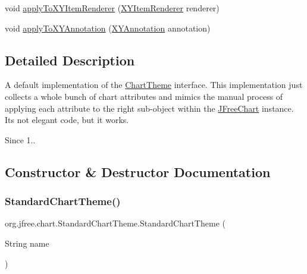 \begin{DoxyCompactItemize}
\item 
void \mbox{\hyperlink{classorg_1_1jfree_1_1chart_1_1_standard_chart_theme_a0f9789c48f6cdc9565b0b6bcf2bc8e77}{apply\+To\+X\+Y\+Item\+Renderer}} (\mbox{\hyperlink{interfaceorg_1_1jfree_1_1chart_1_1renderer_1_1xy_1_1_x_y_item_renderer}{X\+Y\+Item\+Renderer}} renderer)
\item 
void \mbox{\hyperlink{classorg_1_1jfree_1_1chart_1_1_standard_chart_theme_ad9eadb695bdcb77bb0af40678c41b848}{apply\+To\+X\+Y\+Annotation}} (\mbox{\hyperlink{interfaceorg_1_1jfree_1_1chart_1_1annotations_1_1_x_y_annotation}{X\+Y\+Annotation}} annotation)
\end{DoxyCompactItemize}


\subsection{Detailed Description}
A default implementation of the \mbox{\hyperlink{interfaceorg_1_1jfree_1_1chart_1_1_chart_theme}{Chart\+Theme}} interface. This implementation just collects a whole bunch of chart attributes and mimics the manual process of applying each attribute to the right sub-\/object within the \mbox{\hyperlink{classorg_1_1jfree_1_1chart_1_1_j_free_chart}{J\+Free\+Chart}} instance. It\textquotesingle{}s not elegant code, but it works.

\begin{DoxySince}{Since}
1.. 
\end{DoxySince}


\subsection{Constructor \& Destructor Documentation}
\mbox{\label{classorg_1_1jfree_1_1chart_1_1_standard_chart_theme_ac7cf45b617ae438b35cfeb4bfda6268a}} 
\subsubsection{\texorpdfstring{Standard\+Chart\+Theme()}{StandardChartTheme()}\hspace{0.1cm}{\footnotesize\ttfamily [1/2]}}
{\footnotesize\ttfamily org.\+jfree.\+chart.\+Standard\+Chart\+Theme.\+Standard\+Chart\+Theme (\begin{DoxyParamCaption}\item[{String}]{name }\end{DoxyParamCaption})}

